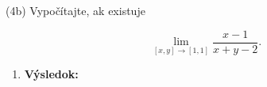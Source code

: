 \pr (4b) Vypočítajte, ak existuje

$$
\lim\limits_{
[x,y]\rightarrow [1,1]}
\frac{x-1}{x+y-2}.
$$
\begin{enumerate}
\item[]\textbf{Výsledok:}\gr
\end{enumerate}
